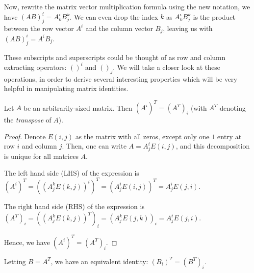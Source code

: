 Now, rewrite the matrix vector multiplication formula using the new notation, we
have \( (AB)^{i}_{j} = A^{i}_{k}B^{k}_{j}  \). We can even drop the index \( k
\) as \( A^{i}_{k}B^{k}_{j}  \) is the product between the row vector \( A^{i}
\) and the column vector \( B_{j}\), leaving us with \( (AB)^{i}_{j} = A^{i}
B_{j}  \).

These subscripts and superscripts could be thought of as row and column
extracting operators: \( ()^{i} \) and \( ()_{j} \). We will take a closer look
at these operations, in order to derive several interesting properties which
will be very helpful in manipulating matrix identities.

\begin{theorem}
  Let \( A \) be an arbitrarily-sized matrix. Then \( (A^{i})^{T} = (A^{T}
  )_{i} \) (with \( A^{T}  \) denoting the \textit{transpose} of \( A \)).
\end{theorem}

\begin{proof}
  Denote \( E(i, j) \) as the matrix with all zeros, except only one \( 1 \)
  entry at row \( i \) and column \( j \). Then, one can write \(
  A=A^{i}_{j}E(i, j) \), and this decomposition is unique for all matrices
  \( A \).

  The left hand side (LHS) of the expression is \( (A^{i})^{T} = ((A^{k}_{j}E(k,
  j))^{i})^{T} = (A^{i}_{j}E(i, j))^{T} = A^{i}_{j}E(j, i)   \).

  The right hand side (RHS) of the expression is \( (A^{T}
  )_{i}=((A^{k}_{j}E(k, j))^{T} )_{i} = (A^{k}_{j}E(j, k))_{i} = A^{i}_{j}E(j,
  i) \).

  Hence, we have \( (A^{i})^{T} = (A^{T} )_{i}  \).
\end{proof}

Letting \( B=A^{T}  \), we have an equivalent identity: \( (B_{i})^{T} =
(B^{T})_{i} \).

